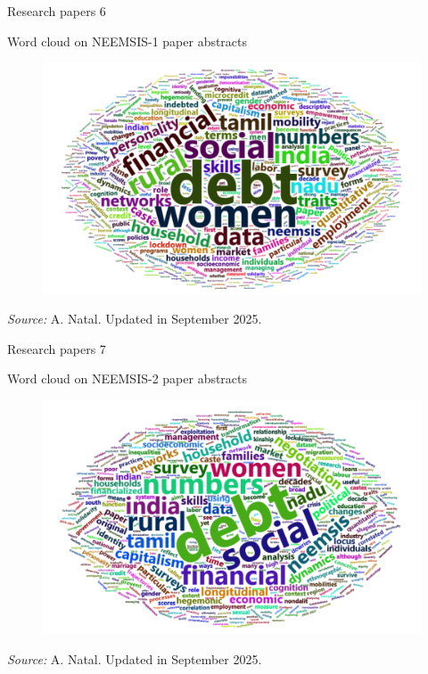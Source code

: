\documentclass[aspectratio=169]{beamer}
\begin{document}
\begin{frame}{Research papers 6}
\begin{footnotesize}

Word cloud on NEEMSIS-1 paper abstracts
\begin{figure}[h]
\centering
\includegraphics[width=0.65\columnwidth]{INPUT/neemsis1.png}
\end{figure}
\textit{Source:} A. Natal. Updated in September 2025.

\end{footnotesize}
\end{frame}



\begin{frame}{Research papers 7}
\begin{footnotesize}

Word cloud on NEEMSIS-2 paper abstracts
\begin{figure}[h]
\centering
\includegraphics[width=0.65\columnwidth]{INPUT/neemsis2.png}
\end{figure}
\textit{Source:} A. Natal. Updated in September 2025.

\end{footnotesize}
\end{frame}
\end{document}
